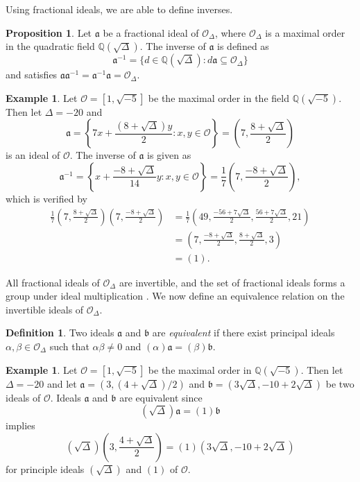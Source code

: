 \documentclass{ucalgthes1}
\theoremstyle{definition}
\newtheorem{prop}[thm]{Proposition}
\newtheorem{defn}[thm]{Definition}
\newtheorem{example}[thm]{Example}
\newcommand{\QQ}{\mathbb{Q}}
\newcommand{\OO}{\mathcal{O}}
\newcommand{\ideal}{\mathfrak}
\begin{document}
Using fractional ideals, we are able to define inverses.

\begin{prop}
\cite[pp.153--154]{Mollin1999}
Let $\ideal a$ be a fractional ideal of $\OO_\Delta$, where $\OO_\Delta$ is a maximal order in the quadratic field $\QQ(\sqrt \Delta)$.  The inverse of $\ideal a$ is defined as
\[
	\ideal a^{-1} = \{ d \in \QQ(\sqrt \Delta) : d \ideal a \subseteq \OO_\Delta \}
\]
and satisfies $\ideal a \ideal a^{-1} = \ideal a^{-1} \ideal a = \OO_\Delta$.
\end{prop}

\begin{example}
Let $\OO = [1, \sqrt{-5}]$ be the maximal order in the field $\QQ(\sqrt{-5})$.  Then let $\Delta = -20$ and
\[
	\ideal a = \left\{7x + \frac{(8 + \sqrt{\Delta})y}{2} : x, y \in \OO \right\}
	= \left( 7, \frac{8 + \sqrt\Delta}{2} \right)
\]
is an ideal of $\OO$.  The inverse of $\ideal a$ is given as
\[
  \ideal a^{-1} = \left\{ x + \frac{-8 + \sqrt\Delta}{14} y : x, y \in \OO \right\}
  = \frac{1}{7} \left( 7, \frac{-8 + \sqrt\Delta}{2} \right),
\]
which is verified by
\begin{align*}
	\frac{1}{7}\left(7, \frac{8 + \sqrt\Delta}{2}\right) \left(7, \frac{-8+\sqrt\Delta}{2} \right)
	&= \frac{1}{7}\left(49, \frac{-56+7\sqrt\Delta}{2}, \frac{56 + 7\sqrt\Delta}{2}, 21 \right) \\
	&= \left(7, \frac{-8 + \sqrt\Delta}{2}, \frac{8 + \sqrt\Delta}{2}, 3 \right) \\
	&= (1).
\end{align*}
\end{example}

All fractional ideals of $\OO_\Delta$ are invertible, and the set of fractional ideals forms a group under ideal multiplication \cite[Theorem 2.26]{Sawilla2004}.  We now define an equivalence relation on the invertible ideals of $\OO_\Delta$.

\begin{defn}
\cite[p.88]{Jacobson2009} Two ideals $\ideal a$ and $\ideal b$ are \emph{equivalent} if there exist principal ideals $\alpha, \beta \in \OO_\Delta$ such that $\alpha \beta \neq 0$ and $(\alpha)\ideal a = (\beta) \ideal b$.
\end{defn}

\begin{example}
Let $\OO = [1, \sqrt{-5}]$ be the maximal order in $\QQ(\sqrt{-5})$.  Then let $\Delta = -20$ and let $\ideal a = (3, (4+\sqrt\Delta)/2)$ and $\ideal b = (3 \sqrt\Delta, -10 + 2 \sqrt\Delta)$ be two ideals of $\OO$.  Ideals $\ideal a$ and $\ideal b$ are equivalent since
\[
(\sqrt\Delta) \ideal a = (1)\ideal b
\]
implies
\[
(\sqrt\Delta) \left(3, \frac{4+\sqrt\Delta}{2}\right) = (1)(3 \sqrt\Delta, -10 + 2 \sqrt\Delta)
\]
for principle ideals $(\sqrt\Delta)$ and $(1)$ of $\OO$.
\end{example}
\end{document}
